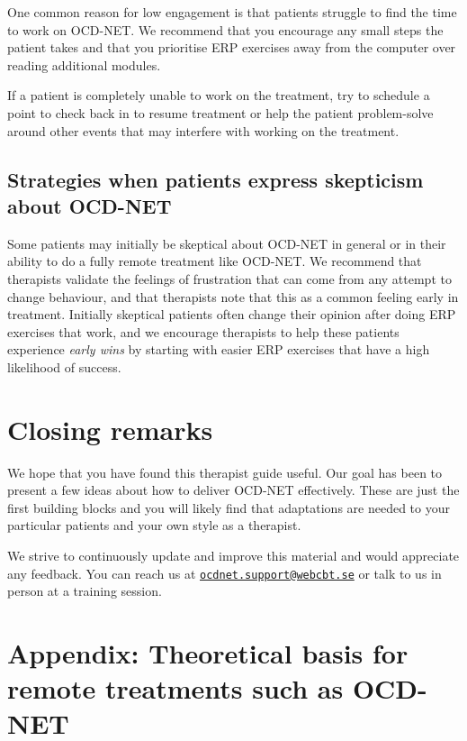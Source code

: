 \documentclass[]{book}
\theoremstyle{definition}
\theoremstyle{definition}
\theoremstyle{definition}
\theoremstyle{remark}
\begin{document}
One common reason for low engagement is that patients struggle to find
the time to work on OCD-NET. We recommend that you encourage any small
steps the patient takes and that you prioritise ERP exercises away from
the computer over reading additional modules.

If a patient is completely unable to work on the treatment, try to
schedule a point to check back in to resume treatment or help the
patient problem-solve around other events that may interfere with
working on the treatment.

\hypertarget{strategies-when-patients-express-skepticism-about-ocd-net}{%
\subsection{Strategies when patients express skepticism about
OCD-NET}\label{strategies-when-patients-express-skepticism-about-ocd-net}}

Some patients may initially be skeptical about OCD-NET in general or in
their ability to do a fully remote treatment like OCD-NET. We recommend
that therapists validate the feelings of frustration that can come from
any attempt to change behaviour, and that therapists note that this as a
common feeling early in treatment. Initially skeptical patients often
change their opinion after doing ERP exercises that work, and we
encourage therapists to help these patients experience \emph{early wins}
by starting with easier ERP exercises that have a high likelihood of
success.

\hypertarget{closing-remarks}{%
\section{Closing remarks}\label{closing-remarks}}

We hope that you have found this therapist guide useful. Our goal has
been to present a few ideas about how to deliver OCD-NET effectively.
These are just the first building blocks and you will likely find that
adaptations are needed to your particular patients and your own style as
a therapist.

We strive to continuously update and improve this material and would
appreciate any feedback. You can reach us at
\href{mailto:ocdnet.support@webcbt.se}{\nolinkurl{ocdnet.support@webcbt.se}}
or talk to us in person at a training session.

\hypertarget{appendix-theoretical-basis-for-remote-treatments-such-as-ocd-net}{%
\section{Appendix: Theoretical basis for remote treatments such as
OCD-NET}\label{appendix-theoretical-basis-for-remote-treatments-such-as-ocd-net}}
\end{document}
